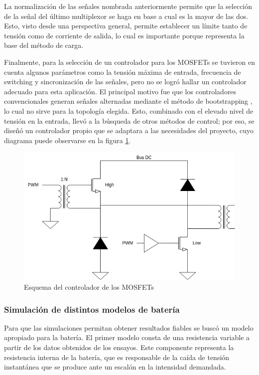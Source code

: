 La normalización de las señales nombrada anteriormente permite que la selección de la señal del último multiplexor
se haga en base a cual es la mayor de las dos. Esto, visto desde una perspectiva general, permite establecer un límite
tanto de tensión como de corriente de salida, lo cual es importante porque representa la base del método de carga.

Finalmente, para la selección de un controlador para los MOSFETs se tuvieron en cuenta algunos parámetros como
la tensión máxima de entrada, frecuencia de switching y sincronización de las señales,
pero no se logró hallar un controlador adecuado para esta aplicación.
El principal motivo fue que los controladores convencionales generan señales alternadas mediante el método de bootstrapping \cite{hart},
lo cual no sirve para la topología elegida. Esto, combinado con el elevado nivel de tensión en la entrada,
llevó a la búsqueda de otros métodos de control; por eso, se diseñó un controlador propio que se adaptara
a las necesidades del proyecto, cuyo diagrama puede observarse en la figura \ref{fig:driver}.

\begin{figure}
    \centering
    \includegraphics[width=\textwidth]{images/driver.png}
    \caption{Esquema del controlador de los MOSFETs}
    \label{fig:driver}
\end{figure}

\subsubsection{Simulación de distintos modelos de batería}
Para que las simulaciones permitan obtener resultados fiables se buscó un modelo apropiado para la batería.
El primer modelo consta de una resistencia variable a partir de los datos obtenidos de los ensayos. 
Este componente representa la resistencia interna de la batería, que es responsable de la caída de tensión instantánea que se produce ante un escalón en la intensidad demandada.

